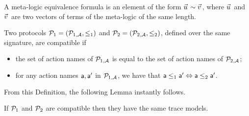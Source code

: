 \begin{definition}
  A meta-logic equivalence formula is an element of the form $\pvec{u} \sim \pvec{v}$, where $\pvec{u}$ and $\pvec{v}$ are two vectors of terms of the meta-logic of the same length.
\end{definition}

\begin{definition}
  Two protocols $\mathcal{P}_1 = (\mathcal{P}_{1,\mathcal{A}},\leq_1)$ and $\mathcal{P}_2 = (\mathcal{P}_{2,\mathcal{A}}, \leq_2)$, defined over the same signature, are compatible if
  \begin{itemize}
  \item   the set of action names of $\mathcal{P}_{1,\mathcal{A}}$ is equal to the set of action names of  $\mathcal{P}_{2,\mathcal{A}}$;
    \item  for any action names $\textsf{a},\textsf{a}'$ in  $\mathcal{P}_{1,\mathcal{A}}$, we have that $ \textsf{a} \leq_1 \textsf{a}' \Leftrightarrow \textsf{a} \leq_2 \textsf{a}'$.
  \end{itemize}

\end{definition}

From this Definition, the following Lemma instantly follows.
\begin{lemma}
  If $\mathcal{P}_1$ and $\mathcal{P}_2$ are compatible then they have the same trace models.
\end{lemma}



